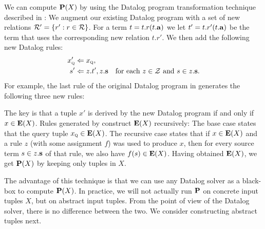 We can compute $\mathbf{P}(X)$ by using the Datalog program transformation technique described in 
\cite{liang11minimal}:
We augment our existing Datalog program with a set of new relations $\mathcal{R}' = \{ r' : r \in \mathcal{R} \}$.
For a term $t = t.r(t.\mathbf{a})$ we let $t' = t.r'(t.\mathbf{a})$ be the term that uses the corresponding new relation $t.r'$.
We then add the following new Datalog rules:
\begin{align}
x_\text{\sc q}' &\Leftarrow x_\text{\sc q}, \label{eqn:revBase} \\
s'   &\Leftarrow z.t', z.\mathbf{s} \quad \text{for each $z \in \mathcal{Z}$ and $s \in z.\mathbf{s}$.} \label{eqn:indBase}
\end{align}
For example, the last rule of the original Datalog program in  generates the following three new rules:
\begin{center}
\end{center}

The key is that a tuple $x'$ is derived by the new Datalog program if and only if $x \in \mathbf{E}(X)$.
Rules generated by  construct $\mathbf{E}(X)$ recursively:
The base case  states that the query tuple $x_\text{\sc q} \in \mathbf{E}(X)$.
The recursive case  states that if $x \in \mathbf{E}(X)$ and a rule $z$ (with some assignment $f$)
was used to produce $x$, then for every source term $s \in z.\mathbf{s}$ of that rule,
we also have $f(s) \in \mathbf{E}(X)$.
Having obtained $\mathbf{E}(X)$, we get $\mathbf{P}(X)$ by keeping only tuples in $X$.

The advantage of this technique is that we can use any Datalog solver as a black-box to compute $\mathbf{P}(X)$.
In practice, we will not actually run $\mathbf{P}$ on concrete input tuples $X$, but on abstract input tuples.
From the point of view of the Datalog solver, there is no difference between the two.
We consider constructing abstract tuples next.


